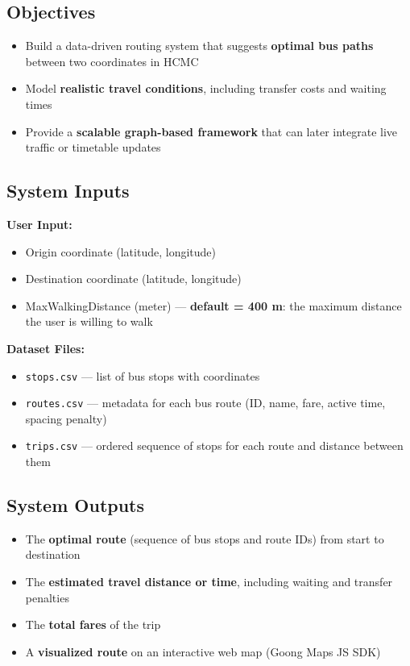 \subsection{Objectives}

\begin{itemize}
    \item Build a data-driven routing system that suggests \textbf{optimal bus paths} between two coordinates in HCMC
    \item Model \textbf{realistic travel conditions}, including transfer costs and waiting times
    \item Provide a \textbf{scalable graph-based framework} that can later integrate live traffic or timetable updates
\end{itemize}

\subsection{System Inputs}

\textbf{User Input:}
\begin{itemize}
    \item Origin coordinate (latitude, longitude)
    \item Destination coordinate (latitude, longitude)
    \item MaxWalkingDistance (meter) — \textbf{default = 400 m}: the maximum distance the user is willing to walk
\end{itemize}

\textbf{Dataset Files:}
\begin{itemize}
    \item \texttt{stops.csv} — list of bus stops with coordinates
    \item \texttt{routes.csv} — metadata for each bus route (ID, name, fare, active time, spacing penalty)
    \item \texttt{trips.csv} — ordered sequence of stops for each route and distance between them
\end{itemize}

\subsection{System Outputs}

\begin{itemize}
    \item The \textbf{optimal route} (sequence of bus stops and route IDs) from start to destination
    \item The \textbf{estimated travel distance or time}, including waiting and transfer penalties
    \item The \textbf{total fares} of the trip
    \item A \textbf{visualized route} on an interactive web map (Goong Maps JS SDK)
\end{itemize}

